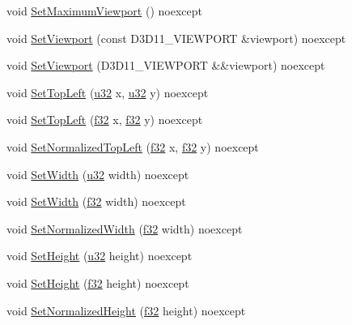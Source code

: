 \begin{DoxyCompactItemize}
\item 
void \hyperlink{structmage_1_1_viewport_a5af006b8ec0464a924c3822265727ee2}{Set\+Maximum\+Viewport} () noexcept
\item 
void \hyperlink{structmage_1_1_viewport_a12a0d7b74ce81786e38f08d399acafc6}{Set\+Viewport} (const D3\+D11\+\_\+\+V\+I\+E\+W\+P\+O\+RT \&viewport) noexcept
\item 
void \hyperlink{structmage_1_1_viewport_a12c41f937452bb1897558f0126947b22}{Set\+Viewport} (D3\+D11\+\_\+\+V\+I\+E\+W\+P\+O\+RT \&\&viewport) noexcept
\item 
void \hyperlink{structmage_1_1_viewport_ab3874d1da8c9d85623e3a36af58ac6b9}{Set\+Top\+Left} (\hyperlink{namespacemage_af2b398bf98eb10351f49cad73fe2cc73}{u32} x, \hyperlink{namespacemage_af2b398bf98eb10351f49cad73fe2cc73}{u32} y) noexcept
\item 
void \hyperlink{structmage_1_1_viewport_a1c420f09a0a0df0addaee81ca3a62089}{Set\+Top\+Left} (\hyperlink{namespacemage_a6a44ad388483959dc4dff9f2aef91431}{f32} x, \hyperlink{namespacemage_a6a44ad388483959dc4dff9f2aef91431}{f32} y) noexcept
\item 
void \hyperlink{structmage_1_1_viewport_aca93791eaf1102314871b1b440e3dc4b}{Set\+Normalized\+Top\+Left} (\hyperlink{namespacemage_a6a44ad388483959dc4dff9f2aef91431}{f32} x, \hyperlink{namespacemage_a6a44ad388483959dc4dff9f2aef91431}{f32} y) noexcept
\item 
void \hyperlink{structmage_1_1_viewport_a9601d9f0b8854a6ea4840bacfef79b24}{Set\+Width} (\hyperlink{namespacemage_af2b398bf98eb10351f49cad73fe2cc73}{u32} width) noexcept
\item 
void \hyperlink{structmage_1_1_viewport_af842119bb9a261c7af1daa81197f3c02}{Set\+Width} (\hyperlink{namespacemage_a6a44ad388483959dc4dff9f2aef91431}{f32} width) noexcept
\item 
void \hyperlink{structmage_1_1_viewport_a08778de64f3a834e61043458fe44a161}{Set\+Normalized\+Width} (\hyperlink{namespacemage_a6a44ad388483959dc4dff9f2aef91431}{f32} width) noexcept
\item 
void \hyperlink{structmage_1_1_viewport_acee05bd3d8ee5707a677f418a9333368}{Set\+Height} (\hyperlink{namespacemage_af2b398bf98eb10351f49cad73fe2cc73}{u32} height) noexcept
\item 
void \hyperlink{structmage_1_1_viewport_a3714f19949068add0770de77751bb167}{Set\+Height} (\hyperlink{namespacemage_a6a44ad388483959dc4dff9f2aef91431}{f32} height) noexcept
\item 
void \hyperlink{structmage_1_1_viewport_a20788dc2351ce73dcba3af89d348e4c1}{Set\+Normalized\+Height} (\hyperlink{namespacemage_a6a44ad388483959dc4dff9f2aef91431}{f32} height) noexcept

\end{DoxyCompactItemize}
